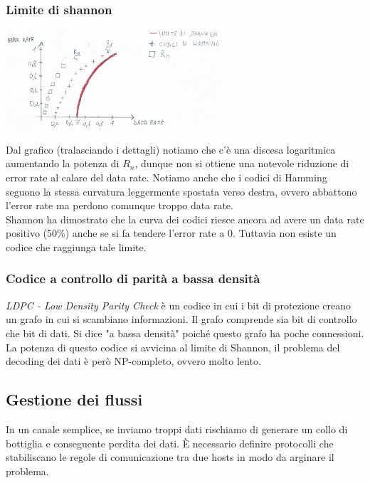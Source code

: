 \documentclass[10pt,a4paper,twoside]{article}
\begin{document}
\subsubsection{Limite di shannon}
\begin{center}
\includegraphics[width=0.6\textwidth]{images/shannon.jpg}
\end{center}
Dal grafico (tralasciando i dettagli) notiamo che c'è una discesa logaritmica aumentando la potenza di $R_n$, dunque non si ottiene una notevole riduzione di error rate al calare del data rate. Notiamo anche che i codici di Hamming seguono la stessa curvatura leggermente spostata verso destra, ovvero abbattono l'error rate ma perdono comunque troppo data rate.\\
Shannon ha dimostrato che la curva dei codici riesce ancora ad avere un data rate positivo (50\%) anche se si fa tendere l'error rate a 0. Tuttavia non esiste un codice che raggiunga tale limite.

\subsubsection{Codice a controllo di parità a bassa densità}
\textit{LDPC - Low Density Parity Check} è un codice in cui i bit di protezione creano un grafo in cui si scambiano informazioni. Il grafo comprende sia bit di controllo che bit di dati. Si dice "a bassa densità" poiché questo grafo ha poche connessioni.\\
La potenza di questo codice si avvicina al limite di Shannon, il problema del decoding dei dati è però NP-completo, ovvero molto lento.

\subsection{Gestione dei flussi}
In un canale semplice, se inviamo troppi dati rischiamo di generare un collo di bottiglia e conseguente perdita dei dati. È necessario definire protocolli che stabiliscano le regole di comunicazione tra due hosts in modo da arginare il problema.
\end{document}

